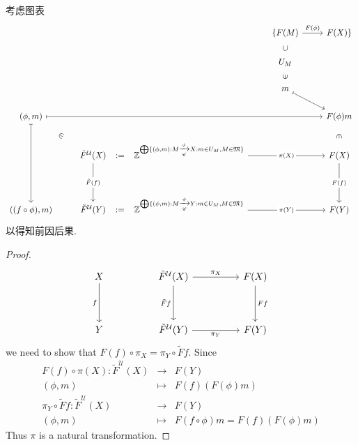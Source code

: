 \documentclass{article}
\begin{document}
\begin{remark}
    考虑图表
    \[\begin{tikzcd}
        &&& {\{F(M)} & {F(X)\}} \\
        &&& {U_M} \\
        &&& m \\
        {(\phi,m)} &&&& {F(\phi)m} \\
        & {\tilde{F}^\mathcal{U}(X)} & {\Z^{\bigoplus\{(\phi,m):M\xrightarrow[\mathscr{C}]{\phi}X:m\in U_M,M\in\mathfrak{M}\}}} && {F(X)} \\
        \\
        {((f \circ \phi),m)} & {\tilde{F}^\mathcal{U}(Y)} & {\Z^{\bigoplus\{(\phi,m):M\xrightarrow[\mathscr{C}]{\phi}Y:m\in U_M,M\in\mathfrak{M}\}}} && {F(Y)}
        \arrow["{:=}"{marking}, draw=none, from=5-2, to=5-3]
        \arrow["{:=}"{marking}, draw=none, from=7-2, to=7-3]
        \arrow["{\tilde{F}(f)}"{description}, from=5-2, to=7-2]
        \arrow["{\pi(X)}"{description}, from=5-3, to=5-5]
        \arrow[maps to, from=4-1, to=7-1]
        \arrow["\in"{marking}, draw=none, from=4-1, to=5-2]
        \arrow["{\pi(Y)}"{description}, from=7-3, to=7-5]
        \arrow["{F(f)}"{description}, from=5-5, to=7-5]
        \arrow["{F(\phi)}", from=1-4, to=1-5]
        \arrow["\subset"{marking}, draw=none, from=2-4, to=1-4]
        \arrow["\in"{marking}, draw=none, from=3-4, to=2-4]
        \arrow[maps to, from=3-4, to=4-5]
        \arrow[maps to, from=4-1, to=4-5]
        \arrow["\in"{marking}, draw=none, from=4-5, to=5-5]
    \end{tikzcd}\]
    以得知前因后果.
\end{remark}
\begin{proof}
    \[\begin{tikzcd}
        X && {\tilde{F}^\mathcal{U}(X)} && {F(X)} \\
        \\
        Y && {\tilde{F}^\mathcal{U}(Y)} && {F(Y)}
        \arrow["f"', from=1-1, to=3-1]
        \arrow["{\pi_X}", from=1-3, to=1-5]
        \arrow["{\pi_Y}"', from=3-3, to=3-5]
        \arrow["{\tilde{F}f}"', from=1-3, to=3-3]
        \arrow["Ff", from=1-5, to=3-5]
    \end{tikzcd}\]
    we need to show that $F(f) \circ \pi_X = \pi_Y \circ \tilde{F}f$. Since
    \begin{eqnarray*}
        F(f)\circ \pi(X): \tilde{F}^\mathcal{U}(X) &\to& F(Y)\\
        (\phi,m) &\mapsto& F(f)(F(\phi)m) \\
        \pi_Y \circ \tilde{F}f : \tilde{F}^\mathcal{U}(X) &\to& F(Y)\\
        (\phi,m) &\mapsto& F(f \circ \phi)m = F(f)(F(\phi)m)
    \end{eqnarray*}
    Thus $\pi$ is a natural transformation.
\end{proof}
\end{document}
